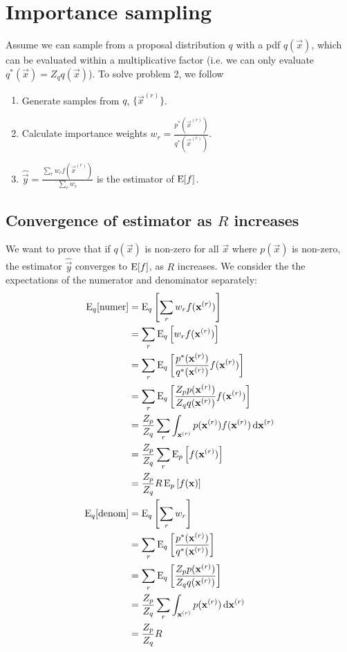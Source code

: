 \section{Importance sampling}

Assume we can sample from a proposal distribution $q$ with a pdf $q(\vec x)$, which can be evaluated within a multiplicative factor (i.e. we can only evaluate $q^\ast(\vec x) = Z_q q(\vec x)$). To solve problem 2, we follow
\begin{enumerate}
    \item Generate samples from $q$, $\{\vec x^{(r)}\}$.
    \item Calculate importance weights $w_r = \frac{p^\ast(\vec x^{(r)})}{q^\ast(\vec x^{(r)})}$.
    \item $\hat{\vec y} = \frac{\sum_r w_r f(\vec x^{(r)})}{\sum_r w_r}$ is the estimator of $\operatorname{\mathrm{E}}[f]$.
\end{enumerate}

\subsection{Convergence of estimator as $R$ increases}
    We want to prove that if $q(\vec x)$ is non-zero for all $\vec x$ where $p(\vec x)$ is non-zero, the estimator $\hat{\vec y}$ converges to $\operatorname{\mathrm{E}}[f]$, as $R$ increases. We consider the the expectations of the numerator and denominator separately:
    \begin{align}
        \operatorname{\mathrm{E}}_q[\text{numer}]  &= \operatorname{\mathrm{E}}_q\left[\sum_r w_r f(\boldsymbol{\mathbf{x}}^{(r)})\right] \\
                            &= \sum_r \operatorname{\mathrm{E}}_q\left[w_r f(\boldsymbol{\mathbf{x}}^{(r)})\right] \\
                            &= \sum_r \operatorname{\mathrm{E}}_q\left[\frac{p^\ast(\boldsymbol{\mathbf{x}}^{(r)})}{q^\ast(\boldsymbol{\mathbf{x}}^{(r)})} f(\boldsymbol{\mathbf{x}}^{(r)})\right] \\
                            &= \sum_r \operatorname{\mathrm{E}}_q\left[\frac{Z_p p(\boldsymbol{\mathbf{x}}^{(r)})}{Z_q q(\boldsymbol{\mathbf{x}}^{(r)})} f(\boldsymbol{\mathbf{x}}^{(r)})\right] \\
                            &= \frac{Z_p}{Z_q} \sum_r \int_{\boldsymbol{\mathbf{x}}^{(r)}} p(\boldsymbol{\mathbf{x}}^{(r)}) f(\boldsymbol{\mathbf{x}}^{(r)}) \, \mathrm d \boldsymbol{\mathbf{x}}^{(r)} \\
                            &= \frac{Z_p}{Z_q} \sum_r \operatorname{\mathrm{E}}_p\left[f(\boldsymbol{\mathbf{x}}^{(r)})\right] \\
                            &= \frac{Z_p}{Z_q} R \operatorname{\mathrm{E}}_p\left[f(\boldsymbol{\mathbf{x}})\right] \\
        \operatorname{\mathrm{E}}_q[\text{denom}]  &= \operatorname{\mathrm{E}}_q\left[\sum_r w_r\right] \\
                            &= \sum_r \operatorname{\mathrm{E}}_q\left[\frac{p^\ast(\boldsymbol{\mathbf{x}}^{(r)})}{q^\ast(\boldsymbol{\mathbf{x}}^{(r)})}\right] \\
                            &= \sum_r \operatorname{\mathrm{E}}_q\left[\frac{Z_p p(\boldsymbol{\mathbf{x}}^{(r)})}{Z_q q(\boldsymbol{\mathbf{x}}^{(r)})}\right] \\
                            &= \frac{Z_p}{Z_q} \sum_r \int_{\boldsymbol{\mathbf{x}}^{(r)}} p(\boldsymbol{\mathbf{x}}^{(r)}) \,\mathrm d \boldsymbol{\mathbf{x}}^{(r)} \\
                            &= \frac{Z_p}{Z_q} R
    \end{align}

